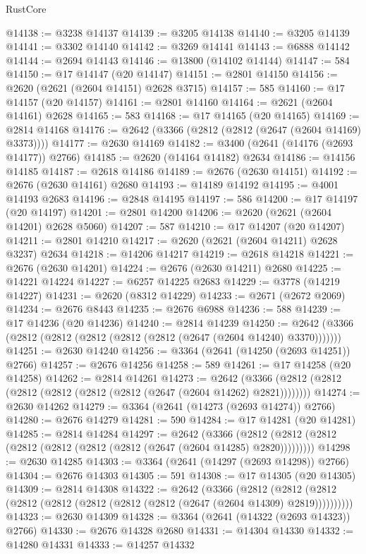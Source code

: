 \begin{lexlean}{RustCore}
\begin{coremodule}
@14138 := @3238 @14137
@14139 := @3205 @14138
@14140 := @3205 @14139
@14141 := @3302 @14140
@14142 := @3269 @14141
@14143 := @6888 @14142
@14144 := @2694 @14143
@14146 := @13800 (@14102 @14144)
@14147 := 584
@14150 := @17 @14147 (@20 @14147)
@14151 := @2801 @14150
@14156 := @2620 (@2621 (@2604 @14151) @2628 @3715)
@14157 := 585
@14160 := @17 @14157 (@20 @14157)
@14161 := @2801 @14160
@14164 := @2621 (@2604 @14161) @2628
@14165 := 583
@14168 := @17 @14165 (@20 @14165)
@14169 := @2814 @14168
@14176 := @2642 (@3366 (@2812 (@2812 (@2647 (@2604 @14169) @3373))))
@14177 := @2630 @14169
@14182 := @3400 (@2641 (@14176 (@2693 @14177)) @2766)
@14185 := @2620 (@14164 @14182) @2634
@14186 := @14156 @14185
@14187 := @2618 @14186
@14189 := @2676 (@2630 @14151)
@14192 := @2676 (@2630 @14161) @2680
@14193 := @14189 @14192
@14195 := @4001 @14193 @2683
@14196 := @2848 @14195
@14197 := 586
@14200 := @17 @14197 (@20 @14197)
@14201 := @2801 @14200
@14206 := @2620 (@2621 (@2604 @14201) @2628 @5060)
@14207 := 587
@14210 := @17 @14207 (@20 @14207)
@14211 := @2801 @14210
@14217 := @2620 (@2621 (@2604 @14211) @2628 @3237) @2634
@14218 := @14206 @14217
@14219 := @2618 @14218
@14221 := @2676 (@2630 @14201)
@14224 := @2676 (@2630 @14211) @2680
@14225 := @14221 @14224
@14227 := @6257 @14225 @2683
@14229 := @3778 (@14219 @14227)
@14231 := @2620 (@8312 @14229)
@14233 := @2671 (@2672 @2069)
@14234 := @2676 @8443
@14235 := @2676 @6988
@14236 := 588
@14239 := @17 @14236 (@20 @14236)
@14240 := @2814 @14239
@14250 := @2642 (@3366 (@2812 (@2812 (@2812 (@2812 (@2812 (@2647 (@2604 @14240) @3370)))))))
@14251 := @2630 @14240
@14256 := @3364 (@2641 (@14250 (@2693 @14251)) @2766)
@14257 := @2676 @14256
@14258 := 589
@14261 := @17 @14258 (@20 @14258)
@14262 := @2814 @14261
@14273 := @2642 (@3366 (@2812 (@2812 (@2812 (@2812 (@2812 (@2812 (@2647 (@2604 @14262) @2821))))))))
@14274 := @2630 @14262
@14279 := @3364 (@2641 (@14273 (@2693 @14274)) @2766)
@14280 := @2676 @14279
@14281 := 590
@14284 := @17 @14281 (@20 @14281)
@14285 := @2814 @14284
@14297 := @2642
    (@3366 (@2812 (@2812 (@2812 (@2812 (@2812 (@2812 (@2812 (@2647 (@2604 @14285) @2820)))))))))
@14298 := @2630 @14285
@14303 := @3364 (@2641 (@14297 (@2693 @14298)) @2766)
@14304 := @2676 @14303
@14305 := 591
@14308 := @17 @14305 (@20 @14305)
@14309 := @2814 @14308
@14322 := @2642
    (@3366
      (@2812 (@2812 (@2812 (@2812 (@2812 (@2812 (@2812 (@2812 (@2647 (@2604 @14309) @2819))))))))))
@14323 := @2630 @14309
@14328 := @3364 (@2641 (@14322 (@2693 @14323)) @2766)
@14330 := @2676 @14328 @2680
@14331 := @14304 @14330
@14332 := @14280 @14331
@14333 := @14257 @14332

\end{coremodule}
\end{lexlean}
